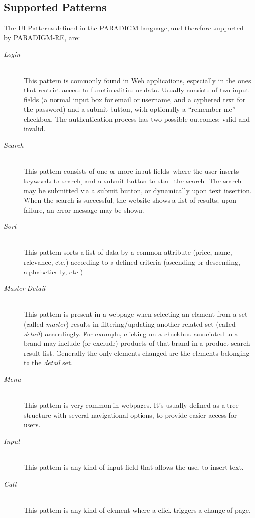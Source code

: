 \documentclass[conference]{IEEEtran}
\begin{document}
\subsection{Supported Patterns}
The UI Patterns defined in the PARADIGM language, and therefore supported by PARADIGM-RE, are:
\begin{description}
\item[\textit{Login}] \hfill \\
This pattern is commonly found in Web applications, especially in the ones that restrict access to functionalities or data. Usually consists of two input fields (a normal input box for email or username, and a cyphered text for the password) and a submit button, with optionally a ``remember me'' checkbox. The authentication process has two possible outcomes: valid and invalid.
\item[\textit{Search}] \hfill \\
This pattern consists of one or more input fields, where the user inserts keywords to search, and a submit button to start the search. The search may be submitted via a submit button, or dynamically upon text insertion. When the search is successful, the website shows a list of results; upon failure, an error message may be shown.
\item[\textit{Sort}] \hfill \\
This pattern sorts a list of data by a common attribute (price, name, relevance, etc.) according to a defined criteria (ascending or descending, alphabetically, etc.).
\item[\textit{Master Detail}] \hfill \\
This pattern is present in a webpage when selecting an element from a set (called \textit{master}) results in filtering/updating another related set (called \textit{detail}) accordingly. For example, clicking on a checkbox associated to a brand may include (or exclude) products of that brand in a product search result list. Generally the only elements changed are the elements belonging to the \textit{detail} set.
\item[\textit{Menu}] \hfill \\
This pattern is very common in webpages. It's usually defined as a tree structure with several navigational options, to provide easier access for users. 
\item[\textit{Input}] \hfill \\
This pattern is any kind of input field that allows the user to insert text.
\item[\textit{Call}] \hfill \\
This pattern is any kind of element where a click triggers a change of page.
\end{description}
\end{document}
